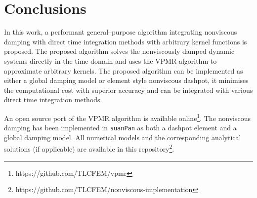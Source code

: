\section{Conclusions}
In this work, a performant general--purpose algorithm integrating nonviscous damping with direct time integration methods with arbitrary kernel functions is proposed.
The proposed algorithm solves the nonviscously damped dynamic systems directly in the time domain and uses the VPMR algorithm to approximate arbitrary kernels.
The proposed algorithm can be implemented as either a global damping model or element style nonviscous dashpot, it minimises the computational cost with superior accuracy and can be integrated with various direct time integration methods.


An open source port of the VPMR algorithm is available online\footnote{https://github.com/TLCFEM/vpmr}.
The nonviscous damping has been implemented in \texttt{suanPan} \citep{Chang2023} as both a dashpot element and a global damping model. All numerical models and the corresponding analytical solutions (if applicable) are available in this repository\footnote{https://github.com/TLCFEM/nonviscous-implementation}.
